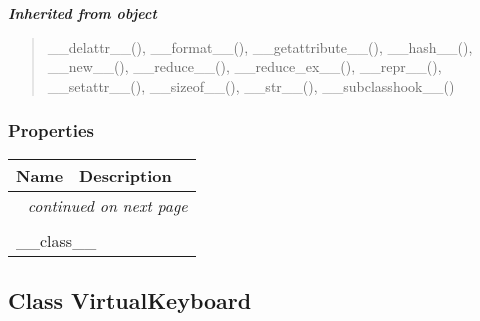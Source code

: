 \large{\textbf{\textit{Inherited from object}}}

\begin{quote}
\_\_delattr\_\_(), \_\_format\_\_(), \_\_getattribute\_\_(), \_\_hash\_\_(), \_\_new\_\_(), \_\_reduce\_\_(), \_\_reduce\_ex\_\_(), \_\_repr\_\_(), \_\_setattr\_\_(), \_\_sizeof\_\_(), \_\_str\_\_(), \_\_subclasshook\_\_()
\end{quote}


  \subsubsection{Properties}

    \vspace{-1cm}
\hspace{\varindent}\begin{longtable}{|p{\varnamewidth}|p{\vardescrwidth}|l}
\cline{1-2}
\cline{1-2} \centering \textbf{Name} & \centering \textbf{Description}& \\
\cline{1-2}
\endhead\cline{1-2}\multicolumn{3}{r}{\small\textit{continued on next page}}\\\endfoot\cline{1-2}
\endlastfoot\multicolumn{2}{|l|}{\textit{Inherited from object}}\\
\multicolumn{2}{|p{\varwidth}|}{\raggedright \_\_class\_\_}\\
\cline{1-2}
\end{longtable}



\subsection{Class VirtualKeyboard}

